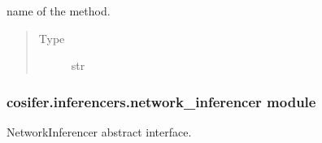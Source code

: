 \documentclass[letterpaper,10pt,english]{sphinxmanual}
\begin{document}
\begin{fulllineitems}
\begin{fulllineitems}
\label{\detokenize{_modules/cosifer.inferencers:cosifer.inferencers.mrnet.MRNET.method}}
name of the method.
\begin{quote}\begin{description}
\item[{Type}] \leavevmode
str

\end{description}\end{quote}

\end{fulllineitems}


\end{fulllineitems}



\subsubsection{cosifer.inferencers.network\_inferencer module}
\label{\detokenize{_modules/cosifer.inferencers:module-cosifer.inferencers.network_inferencer}}\label{\detokenize{_modules/cosifer.inferencers:cosifer-inferencers-network-inferencer-module}}
NetworkInferencer abstract interface.
\end{document}
